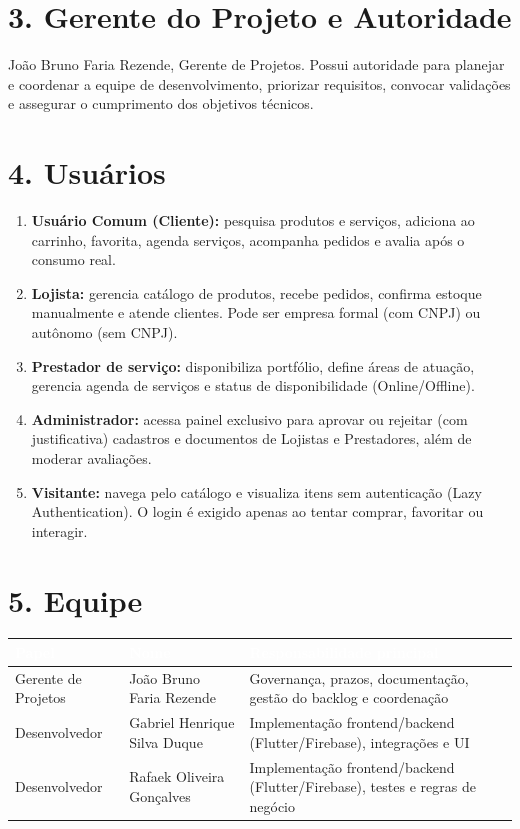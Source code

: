 \documentclass[11pt, a4paper]{article}
\begin{document}
\section*{\textcolor{headerblue}{3. Gerente do Projeto e Autoridade}}
João Bruno Faria Rezende, Gerente de Projetos. Possui autoridade para planejar e coordenar a equipe de desenvolvimento, priorizar requisitos, convocar validações e assegurar o cumprimento dos objetivos técnicos.

\section*{\textcolor{headerblue}{4. Usuários}}
\begin{enumerate}[label=\arabic*.]
    \item \textbf{Usuário Comum (Cliente):} pesquisa produtos e serviços, adiciona ao carrinho, favorita, agenda serviços, acompanha pedidos e avalia após o consumo real.
    \item \textbf{Lojista:} gerencia catálogo de produtos, recebe pedidos, confirma estoque manualmente e atende clientes. Pode ser empresa formal (com CNPJ) ou autônomo (sem CNPJ).
    \item \textbf{Prestador de serviço:} disponibiliza portfólio, define áreas de atuação, gerencia agenda de serviços e status de disponibilidade (Online/Offline).
    \item \textbf{Administrador:} acessa painel exclusivo para aprovar ou rejeitar (com justificativa) cadastros e documentos de Lojistas e Prestadores, além de moderar avaliações.
    \item \textbf{Visitante:} navega pelo catálogo e visualiza itens sem autenticação (Lazy Authentication). O login é exigido apenas ao tentar comprar, favoritar ou interagir.
\end{enumerate}

\section*{\textcolor{headerblue}{5. Equipe}}
\begin{center}
\renewcommand{\arraystretch}{1.3}
\begin{tabularx}{\textwidth}{|l|l|X|}
\hline
\rowcolor{headerblue}
\textcolor{white}{\textbf{Papel}} & \textcolor{white}{\textbf{Nome}} & \textcolor{white}{\textbf{Responsabilidade principal}} \\
\hline
Gerente de Projetos & João Bruno Faria Rezende & Governança, prazos, documentação, gestão do backlog e coordenação \\
\hline
Desenvolvedor & Gabriel Henrique Silva Duque & Implementação frontend/backend (Flutter/Firebase), integrações e UI \\
\hline
Desenvolvedor & Rafaek Oliveira Gonçalves & Implementação frontend/backend (Flutter/Firebase), testes e regras de negócio \\
\hline
\end{tabularx}
\end{center}
\end{document}
